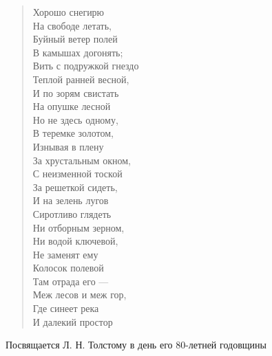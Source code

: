 \begin{verse}
\begin{altverse}
Хорошо снегирю\\
На свободе летать,\\
Буйный ветер полей\\
В камышах догонять;\\
Вить с подружкой гнездо\\
Теплой ранней весной,\\
И по зорям свистать\\
На опушке лесной\ldotst\\
Но не здесь одному,\\
В теремке золотом,\\
Изнывая в плену\\
За хрустальным окном,\\
С неизменной тоской\\
За решеткой сидеть,\\
И на зелень лугов\\
Сиротливо глядеть\ldotst\\
Ни отборным зерном,\\
Ни водой ключевой,\\
Не заменят ему\\
Колосок полевой\ldotst\\
Там отрада его ---\\
Меж лесов и меж гор,\\
Где синеет река\\
И далекий простор\ldotst
\end{altverse}
\end{verse}

\newpage
\vspace*{0cm}



\small{Посвящается Л. Н. Толстому в день его 80-летней годовщины}

